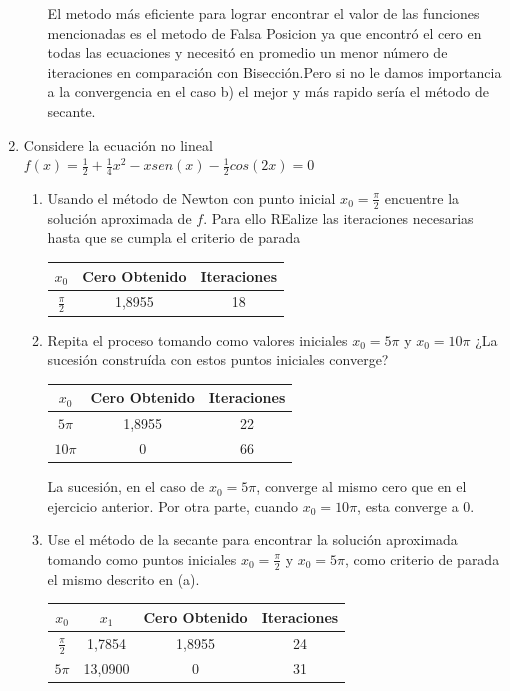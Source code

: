 \documentclass{udparticle}
\begin{document}
\begin{enumerate}
\begin{enumerate}
El metodo más eficiente para lograr encontrar el valor de las funciones mencionadas es el metodo de Falsa Posicion ya que encontró el cero en todas las ecuaciones y necesitó en promedio un menor número de iteraciones en comparación con Bisección.Pero si no le damos importancia a la convergencia en el caso b) el mejor y más rapido sería el método de secante.

\end{enumerate}

\item Considere la ecuación no lineal $f(x)= \frac{1}{2}+\frac{1}{4}x^2-xsen(x)-\frac{1}{2}cos(2x)=0$
	\begin{enumerate}
	\item  Usando el método de Newton con punto inicial $x_{0}=\frac{\pi}{2}$ encuentre la solución aproximada de $f$. Para ello REalize las iteraciones necesarias hasta que se cumpla el criterio de parada %

		\begin{table} [H]
			\centering
			\begin{tabular}{|c|c|c|}
				\hline
				$x_{0}$ & Cero Obtenido & Iteraciones\\
				\hline
				$\frac{\pi}{2} $ & 1,8955 & 18\\
				\hline 
			\end{tabular}
		\end{table}
	
	\item Repita el proceso tomando como valores iniciales $x_{0}=5\pi$ y $x_{0}=10\pi$ ¿La sucesión construída con estos puntos iniciales converge?
	 	\begin{table} [H]
			\centering
			\begin{tabular}{|c|c|c|}
				\hline
				$x_{0}$ & Cero Obtenido & Iteraciones\\
				\hline
				$5\pi$ & 1,8955 & 22 \\
				\hline 
				$10\pi$ & 0 & 66\\
				\hline
			\end{tabular}
		\end{table}
		
La sucesión, en el caso de $x_{0}=5\pi$, converge al mismo cero que en el ejercicio anterior. Por otra parte, cuando $x_{0}=10\pi$, esta converge a 0.

	\item Use el método de la secante para encontrar la solución aproximada tomando como puntos iniciales $x_{0}=\frac{\pi}{2}$ y $x_{0}=5\pi$, como criterio de parada el mismo descrito en (a).
	\begin{table} [H]
			\centering
			\begin{tabular}{|c|c|c|c|}
				\hline
				$x_{0}$& $x_{1}$ & Cero Obtenido & Iteraciones\\
				\hline
				$\frac{\pi}{2}$ & 1,7854 & 1,8955 & 24 \\
				\hline 
				$5\pi$& 13,0900 & 0 & 31\\
				\hline
			\end{tabular}
		\end{table}
		

\end{enumerate}
\end{enumerate}
\end{document}

